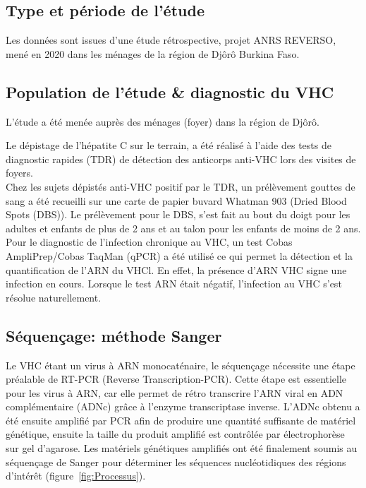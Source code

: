 \documentclass[a4paper,12pt]{article}
\begin{document}
\subsection{Type et période de l’étude}
Les données sont issues d’une étude rétrospective, projet ANRS REVERSO, mené en 2020 dans les ménages de la région de Djôrô Burkina Faso.

\subsection{Population de l'étude \& diagnostic du VHC}

L'étude a été menée auprès des ménages (foyer) dans la région de Djôrô. 




Le dépistage de l’hépatite C sur le terrain, a été réalisé à l’aide des tests de diagnostic rapides (TDR) de détection des anticorps anti-VHC lors des visites de foyers.\\

Chez les sujets dépistés anti-VHC positif par le TDR, un prélèvement gouttes de sang a été recueilli sur une carte de papier buvard Whatman 903 (Dried Blood Spots (DBS)). Le prélèvement pour le DBS, s’est fait au bout du doigt pour les adultes et enfants de plus de 2 ans et au talon pour les enfants de moins de 2 ans. Pour le diagnostic de l’infection chronique au VHC, un test Cobas AmpliPrep/Cobas TaqMan (qPCR) a été utilisé ce qui permet la détection et la quantification de l'ARN du VHCl. En effet, la présence d’ARN VHC signe une infection en cours. Lorsque le test ARN était négatif, l’infection au VHC s’est résolue naturellement. 


\subsection{Séquençage: méthode Sanger}

Le VHC étant un virus à ARN monocaténaire, le séquençage nécessite une étape préalable de RT-PCR (Reverse Transcription-PCR). Cette étape est essentielle pour les virus à ARN, car elle permet de rétro transcrire l’ARN viral en ADN complémentaire (ADNc) grâce à l’enzyme transcriptase inverse. L’ADNc obtenu a été  ensuite amplifié par PCR afin de produire une quantité suffisante de matériel génétique, ensuite la taille du produit amplifié est contrôlée par électrophorèse sur gel d’agarose. Les matériels génétiques amplifiés ont été finalement soumis au séquençage de Sanger pour déterminer les séquences nucléotidiques des régions d’intérêt (figure~\ref{fig:Processus}).
\end{document}
